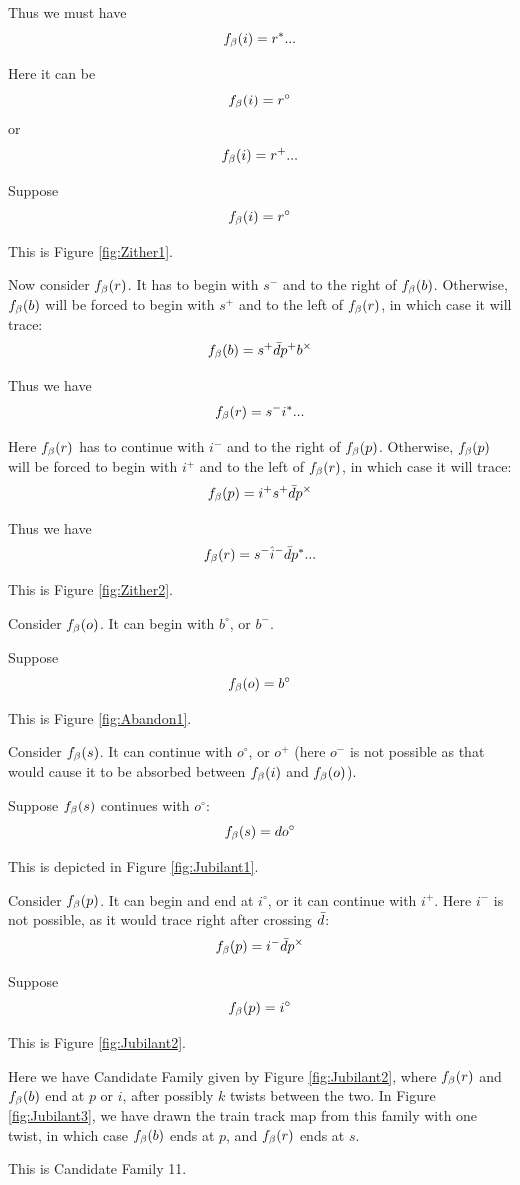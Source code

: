 Thus we must have
\[
f_\beta(i) = r^*...
\]

Here it can be 
\[
f_\beta(i) = r^\circ
\]
or
\[
f_\beta(i) = r^+...
\]

\label{Zither}
Suppose
\[
f_\beta(i) = r^\circ
\]

This is Figure \ref{fig:Zither1}.

Now consider $f_\beta(r)$. It has to begin with $s^-$ and to the right of $f_\beta(b)$. Otherwise, $f_\beta(b)$ will be forced to begin with $s^+$ and to the left of $f_\beta(r)$, in which case it will trace:
\[
f_\beta(b) = s^+ \bar{d} p^+ b^\times
\]

Thus we have
\[
f_\beta(r) = s^- i^*...
\]

Here $f_\beta(r)$ has to continue with $i^-$ and to the right of $f_\beta(p)$. Otherwise, $f_\beta(p)$ will be forced to begin with $i^+$ and to the left of $f_\beta(r)$, in which case it will trace:
\[
f_\beta(p) = i^+ s^+ \bar{d} p^\times
\]

Thus we have
\[
f_\beta(r) = s^- \hat{i}^- \bar{d} p^*...
\]

This is Figure \ref{fig:Zither2}.

Consider $f_\beta(o)$. It can begin with $b^\circ$, or $b^-$.

\label{Abandon}
Suppose
\[
f_\beta(o) = b^\circ
\]

This is Figure \ref{fig:Abandon1}.

Consider $f_\beta(s)$. It can continue with $o^\circ$, or $o^+$ (here $o^-$ is not possible as that would cause it to be absorbed between $f_\beta(i)$ and $f_\beta(o)$).

\label{Jubilant}
Suppose $f_\beta(s)$ continues with $o^\circ$:
\[
f_\beta(s) = d o^\circ
\]

This is depicted in Figure \ref{fig:Jubilant1}.

Consider $f_\beta(p)$. It can begin and end at $i^\circ$, or it can continue with $i^+$. Here $i^-$ is not possible, as it would trace right after crossing $\bar{d}$:
\[
f_\beta(p) = i^- \bar{d} p^\times
\]

Suppose 
\[
f_\beta(p) = i^\circ
\]

This is Figure \ref{fig:Jubilant2}.

Here we have Candidate Family given by Figure \ref{fig:Jubilant2}, where $f_\beta(r)$ and $f_\beta(b)$ end at $p$ or $i$, after possibly $k$ twists between the two. In Figure \ref{fig:Jubilant3}, we have drawn the train track map from this family with one twist, in which case $f_\beta(b)$ ends at $p$, and $f_\beta(r)$ ends at $s$. 


This is Candidate Family 11.


